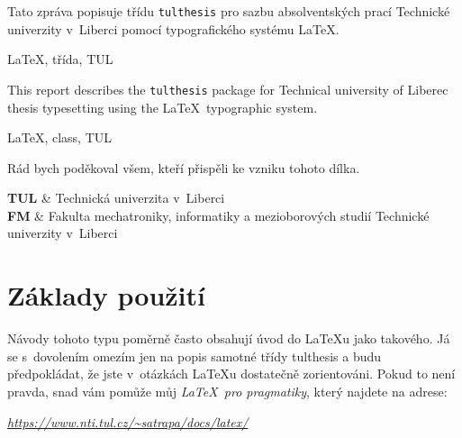 \documentclass[FM,DP,fonts]{tulthesis}
\newcommand{\argument}[1]{{\ttfamily\color{\tulcolor}#1}}
\newenvironment{myquote}{\begin{list}{}{\setlength\leftmargin\parindent}\item[]}{\end{list}}
\begin{document}

\begin{abstractCZ}
Tato zpráva popisuje třídu \texttt{tulthesis} pro sazbu absolventských prací
Technické univerzity v~Liberci pomocí typografického systému \LaTeX.
\end{abstractCZ}

\begin{keywordsCZ}
\LaTeX, třída, TUL
\end{keywordsCZ}

\vspace{2cm}

\begin{abstractEN}
This report describes the \texttt{tulthesis} package for Technical university of
Liberec thesis typesetting using the \LaTeX\ typographic system.
\end{abstractEN}

\begin{keywordsEN}
\LaTeX, class, TUL
\end{keywordsEN}

\clearpage

\begin{acknowledgement}
Rád bych poděkoval všem, kteří přispěli ke vzniku tohoto dílka.
\end{acknowledgement}

\tableofcontents

\clearpage

\begin{abbrList}
\textbf{TUL} & Technická univerzita v~Liberci \\
\textbf{FM} & Fakulta mechatroniky, informatiky a mezioborových studií
Technické univerzity v~Liberci \\
\end{abbrList}

\chapter{Základy použití}

Návody tohoto typu poměrně často obsahují úvod do \LaTeX u jako takového. Já se
s~dovolením omezím jen na popis samotné třídy \argument{tulthesis} a budu
předpokládat, že jste v~otázkách \LaTeX u dostatečně zorientováni. Pokud
to není pravda, snad vám pomůže můj \emph{\LaTeX\ pro pragmatiky}, který
najdete na adrese:

\begin{myquote}
\href{https://www.nti.tul.cz/~satrapa/docs/latex/}{\emph{https://www.nti.tul.cz/\textasciitilde satrapa/docs/latex/}}
\end{myquote}
\end{document}

